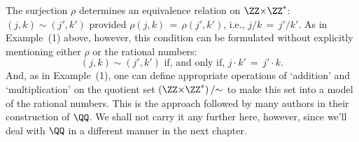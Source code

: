 {{{       The surjection ${\rho}$ determines an equivalence relation on ${\ZZ}{\times}{\ZZ}^{*}$:
    $(j,k) {\sim} (j',k')$ provided ${\rho}(j,k) \,=\, {\rho}(j',k')$, i.e., $j/k \,=\, j'/k'$.
    As in  Example~(1) above, however, this condition can be formulated without explicitly mentioning either ${\rho}$ or the rational numbers:
        \begin{displaymath}
        (j,k) {\sim} (j',k') \mbox{ if, and only if, } j{\cdot}k' \,=\, j'{\cdot}k.
        \end{displaymath}
    And, as in Example~(1), one can define appropriate operations of `addition' and `multiplication' on the quotient set $\left({\ZZ}{\times}{\ZZ}^{*}\right)/{\sim}$ to make this set into a model of the rational numbers.
    This is the approach followed by many authors in their construction of ${\QQ}$.
    We shall not carry it  any further here, however, since we'll deal with ${\QQ}$ in a different manner in the next chapter.
}%
}%
}

\newpage

